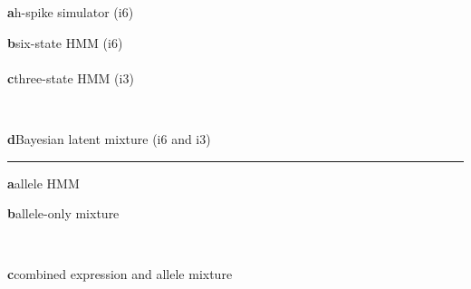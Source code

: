 \documentclass[border=6pt,varwidth=17.5cm]{standalone}
\begin{document}

\begin{minipage}[t]{0.48\linewidth}
  \textbf{a}\quad h-spike simulator (i6)\\[2pt]
  \PlateHspike
\end{minipage}\hfill
\begin{minipage}[t]{0.48\linewidth}
  \textbf{b}\quad six-state HMM (i6)\\[2pt]
  \PlateHMMsix\\[12pt]
  \textbf{c}\quad three-state HMM (i3)\\[2pt]
  \PlateHMMthree
\end{minipage}\\[10pt]
\begin{minipage}[t]{0.6\linewidth}
  \textbf{d}\quad Bayesian latent mixture (i6 and i3)\\[2pt]
  \PlateBayes
\end{minipage}

\vspace{24pt}\hrule\vspace{12pt}

\begin{minipage}[t]{0.44\linewidth}
  \textbf{a}\quad allele HMM\\[2pt]
  \PlateAlleleHMM
\end{minipage}\hfill
\begin{minipage}[t]{0.52\linewidth}
  \textbf{b}\quad allele-only mixture\\[2pt]
  \PlateAlleleMix
\end{minipage}\\[10pt]
\begin{minipage}[t]{\linewidth}
  \textbf{c}\quad combined expression and allele mixture\\[2pt]
  \PlateCombined
\end{minipage}
\end{document}
